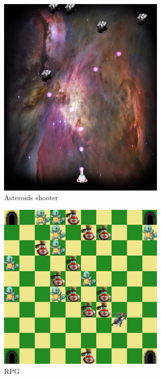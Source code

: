 \begin{figure}
\begin{center}
\includegraphics[width=8cm]{Pics/asteroids.png}
\end{center}
\caption{Asteroids shooter}
\label{fig:asteroids}
\end{figure}

\begin{figure}
\begin{center}
\includegraphics[width=8cm]{Pics/rpg.png}
\end{center}
\caption{RPG}
\label{fig:rpg}
\end{figure}

